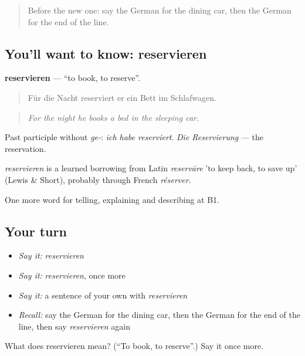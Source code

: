 \begin{quote}
Before the new one: say the German for the dining car, then the German for the end of the line.
\end{quote}

\subsection*{You'll want to know: reservieren}
\textbf{reservieren} — \textquotedblleft{}to book, to reserve\textquotedblright{}.

\begin{quote}
Für die Nacht reserviert er ein Bett im Schlafwagen.
\end{quote}

\begin{quote}
\emph{For the night he books a bed in the sleeping car.}
\end{quote}

Past participle without \emph{ge-}: \emph{ich habe reserviert}. \emph{Die Reservierung} — the reservation.

\begin{cousinweb}
\emph{reservieren} is a learned borrowing from Latin \emph{reservāre} 'to keep back, to save up' (Lewis \& Short), probably through French \emph{réserver}.
\end{cousinweb}

\begin{grammarlens}[title={What you've built}]
One more word for telling, explaining and describing at B1.
\end{grammarlens}

\subsection*{Your turn}
\begin{itemize}
\raggedright
  \item \emph{Say it:} \emph{reservieren}
  \item \emph{Say it:} \emph{reservieren}, once more
  \item \emph{Say it:} a sentence of your own with \emph{reservieren}
  \item \emph{Recall:} say the German for the dining car, then the German for the end of the line, then say \emph{reservieren} again
\end{itemize}

\begin{tcolorbox}[breakable,colback=teal!4,colframe=teal!35!black,title={Before you move on}]
What does reservieren mean? (\textquotedblleft{}To book, to reserve\textquotedblright{}.) Say it once more.
\end{tcolorbox}
